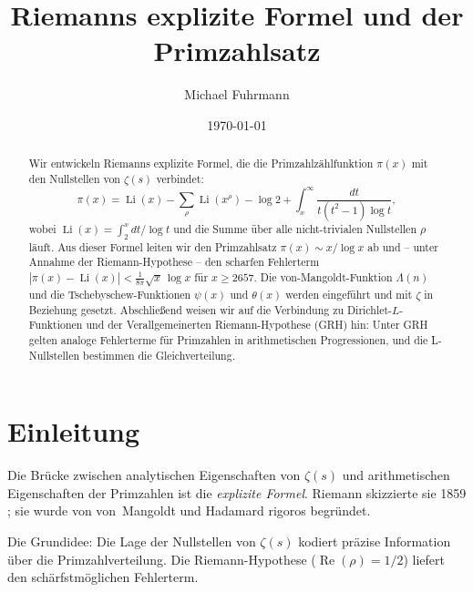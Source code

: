 \documentclass[12pt,a4paper]{amsart}
\theoremstyle{definition}
\DeclareMathOperator{\Re}{Re}
\DeclareMathOperator{\Li}{Li}
\begin{document}

\title{Riemanns explizite Formel und der Primzahlsatz}

\author{Michael Fuhrmann}
\address{Specialist Mathematics Project, Build 84}
\date{\today}

\begin{abstract}
Wir entwickeln Riemanns explizite Formel, die die Primzahlz\"ahlfunktion
$\pi(x)$ mit den Nullstellen von $\zeta(s)$ verbindet:
\[
  \pi(x) = \Li(x) - \sum_\rho \Li(x^\rho) - \log 2
  + \int_x^{\infty} \frac{dt}{t(t^2-1)\log t},
\]
wobei $\Li(x) = \int_2^x dt/\log t$ und die Summe \"uber alle nicht-trivialen
Nullstellen $\rho$ l\"auft.
Aus dieser Formel leiten wir den Primzahlsatz
$\pi(x) \sim x/\log x$ ab und -- unter Annahme der Riemann-Hypothese --
den scharfen Fehlerterm $|\pi(x) - \Li(x)| < \tfrac{1}{8\pi}\sqrt{x}\,\log x$
f\"ur $x \ge 2657$.
Die von-Mangoldt-Funktion $\Lambda(n)$ und die Tschebyschew-Funktionen
$\psi(x)$ und $\theta(x)$ werden eingef\"uhrt und mit $\zeta$ in Beziehung gesetzt.
Abschlie\ss end weisen wir auf die Verbindung zu Dirichlet-$L$-Funktionen
und der Verallgemeinerten Riemann-Hypothese (GRH) hin:
Unter GRH gelten analoge Fehlerterme f\"ur Primzahlen in arithmetischen
Progressionen, und die L-Nullstellen bestimmen die Gleichverteilung.
\end{abstract}

\maketitle
\tableofcontents

\section{Einleitung}

Die Br\"ucke zwischen analytischen Eigenschaften von $\zeta(s)$ und
arithmetischen Eigenschaften der Primzahlen ist die \emph{explizite Formel}.
Riemann skizzierte sie 1859 \cite{Riemann1859};
sie wurde von von~Mangoldt \cite{vonMangoldt1895} und Hadamard \cite{Hadamard1896}
rigoros begr\"undet.

Die Grundidee: Die Lage der Nullstellen von $\zeta(s)$ kodiert pr\"azise
Information \"uber die Primzahlverteilung.
Die Riemann-Hypothese ($\Re(\rho) = 1/2$) liefert den sch\"arfstm\"oglichen
Fehlerterm.
\end{document}
